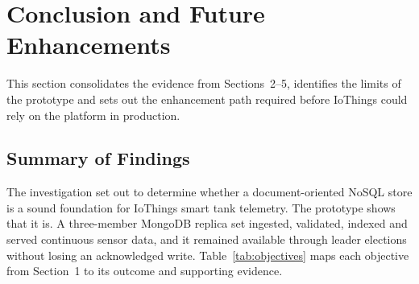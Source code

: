 \documentclass[11pt,a4paper]{article}
\begin{document}
\FloatBarrier
\section{Conclusion and Future Enhancements}

This section consolidates the evidence from Sections~2--5, identifies the limits of the prototype and sets out the enhancement path required before IoThings could rely on the platform in production.

\subsection{Summary of Findings}
The investigation set out to determine whether a document-oriented NoSQL store is a sound foundation for IoThings smart tank telemetry. The prototype shows that it is. A three-member MongoDB replica set ingested, validated, indexed and served continuous sensor data, and it remained available through leader elections without losing an acknowledged write. Table~\ref{tab:objectives} maps each objective from Section~1 to its outcome and supporting evidence.
\end{document}
